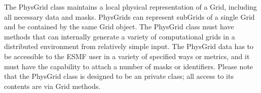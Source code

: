 The PhysGrid class maintains a local physical representation of a Grid,
including all necessary data and masks.  PhysGrids can represent subGrids
of a single Grid and be contained by the same Grid object. The PhysGrid
class must have methods that can internally generate a variety of
computational grids in a distributed environment from relatively simple
input.  The PhysGrid data has to be accessible to the ESMF user in a
variety of specified ways or metrics, and it must have the capability to
attach a number of masks or identifiers.  Please note that the PhysGrid class
is designed to be an private class; all access to its contents are via
Grid methods.

